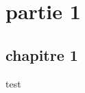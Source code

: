 \documentclass[phd,final]{theseUL}
\begin{document}
\part{partie 1}
\chapter{chapitre 1}
test
 
\end{document}
